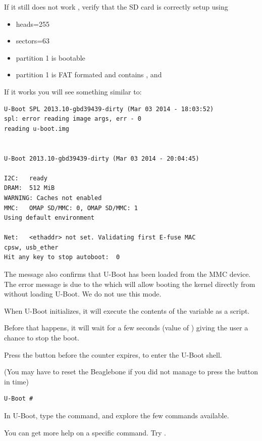 If it still does not work , verify that the SD card is correctly setup using  

\begin{itemize}
\item heads=255
\item sectors=63
\item partition 1 is bootable
\item partition 1 is FAT formated and contains ,  and 
\end{itemize}


\clearpage

If it works you will see something similar to:

\begin{verbatim}
U-Boot SPL 2013.10-gbd39439-dirty (Mar 03 2014 - 18:03:52)
spl: error reading image args, err - 0
reading u-boot.img


U-Boot 2013.10-gbd39439-dirty (Mar 03 2014 - 20:04:45)

I2C:   ready
DRAM:  512 MiB
WARNING: Caches not enabled
MMC:   OMAP SD/MMC: 0, OMAP SD/MMC: 1
Using default environment

Net:   <ethaddr> not set. Validating first E-fuse MAC
cpsw, usb_ether
Hit any key to stop autoboot:  0 
\end{verbatim}

The message  also confirms that U-Boot has
been loaded from the MMC device. The error message is due to the  which
will allow booting the kernel directly from  without loading U-Boot. We do not use this mode.

When U-Boot initializes, it will execute the contents of the  variable as a script.

Before that happens, it will wait for a few seconds (value of ) giving
the user a chance to stop the boot. 

Press the  button before the counter expires, to enter the U-Boot shell.

 (You may have to reset the Beaglebone if you
did not manage to press the  button in time)
\begin{verbatim}
U-Boot #
\end{verbatim}

In U-Boot, type the  command, and explore the few commands available.

You can get more help on a specific command. Try .

